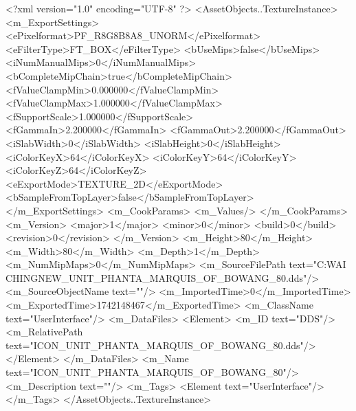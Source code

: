 <?xml version="1.0" encoding="UTF-8" ?>
<AssetObjects..TextureInstance>
	<m_ExportSettings>
		<ePixelformat>PF_R8G8B8A8_UNORM</ePixelformat>
		<eFilterType>FT_BOX</eFilterType>
		<bUseMips>false</bUseMips>
		<iNumManualMips>0</iNumManualMips>
		<bCompleteMipChain>true</bCompleteMipChain>
		<fValueClampMin>0.000000</fValueClampMin>
		<fValueClampMax>1.000000</fValueClampMax>
		<fSupportScale>1.000000</fSupportScale>
		<fGammaIn>2.200000</fGammaIn>
		<fGammaOut>2.200000</fGammaOut>
		<iSlabWidth>0</iSlabWidth>
		<iSlabHeight>0</iSlabHeight>
		<iColorKeyX>64</iColorKeyX>
		<iColorKeyY>64</iColorKeyY>
		<iColorKeyZ>64</iColorKeyZ>
		<eExportMode>TEXTURE_2D</eExportMode>
		<bSampleFromTopLayer>false</bSampleFromTopLayer>
	</m_ExportSettings>
	<m_CookParams>
		<m_Values/>
	</m_CookParams>
	<m_Version>
		<major>1</major>
		<minor>0</minor>
		<build>0</build>
		<revision>0</revision>
	</m_Version>
	<m_Height>80</m_Height>
	<m_Width>80</m_Width>
	<m_Depth>1</m_Depth>
	<m_NumMipMaps>0</m_NumMipMaps>
	<m_SourceFilePath text="C:\Users\YANG WAI CHING\Downloads\CIV\DDS NEW\ICON_UNIT_PHANTA_MARQUIS_OF_BOWANG_80.dds"/>
	<m_SourceObjectName text=""/>
	<m_ImportedTime>0</m_ImportedTime>
	<m_ExportedTime>1742148467</m_ExportedTime>
	<m_ClassName text="UserInterface"/>
	<m_DataFiles>
		<Element>
			<m_ID text="DDS"/>
			<m_RelativePath text="ICON_UNIT_PHANTA_MARQUIS_OF_BOWANG_80.dds"/>
		</Element>
	</m_DataFiles>
	<m_Name text="ICON_UNIT_PHANTA_MARQUIS_OF_BOWANG_80"/>
	<m_Description text=""/>
	<m_Tags>
		<Element text="UserInterface"/>
	</m_Tags>
</AssetObjects..TextureInstance>

